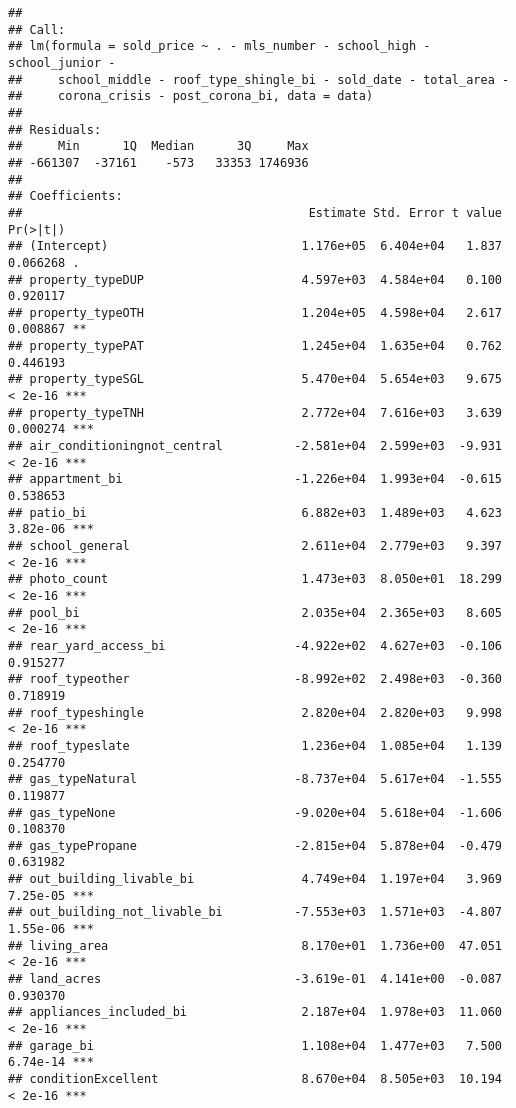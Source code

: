 \documentclass[
]{article}
\begin{document}
\begin{verbatim}
## 
## Call:
## lm(formula = sold_price ~ . - mls_number - school_high - school_junior - 
##     school_middle - roof_type_shingle_bi - sold_date - total_area - 
##     corona_crisis - post_corona_bi, data = data)
## 
## Residuals:
##     Min      1Q  Median      3Q     Max 
## -661307  -37161    -573   33353 1746936 
## 
## Coefficients:
##                                        Estimate Std. Error t value Pr(>|t|)    
## (Intercept)                           1.176e+05  6.404e+04   1.837 0.066268 .  
## property_typeDUP                      4.597e+03  4.584e+04   0.100 0.920117    
## property_typeOTH                      1.204e+05  4.598e+04   2.617 0.008867 ** 
## property_typePAT                      1.245e+04  1.635e+04   0.762 0.446193    
## property_typeSGL                      5.470e+04  5.654e+03   9.675  < 2e-16 ***
## property_typeTNH                      2.772e+04  7.616e+03   3.639 0.000274 ***
## air_conditioningnot_central          -2.581e+04  2.599e+03  -9.931  < 2e-16 ***
## appartment_bi                        -1.226e+04  1.993e+04  -0.615 0.538653    
## patio_bi                              6.882e+03  1.489e+03   4.623 3.82e-06 ***
## school_general                        2.611e+04  2.779e+03   9.397  < 2e-16 ***
## photo_count                           1.473e+03  8.050e+01  18.299  < 2e-16 ***
## pool_bi                               2.035e+04  2.365e+03   8.605  < 2e-16 ***
## rear_yard_access_bi                  -4.922e+02  4.627e+03  -0.106 0.915277    
## roof_typeother                       -8.992e+02  2.498e+03  -0.360 0.718919    
## roof_typeshingle                      2.820e+04  2.820e+03   9.998  < 2e-16 ***
## roof_typeslate                        1.236e+04  1.085e+04   1.139 0.254770    
## gas_typeNatural                      -8.737e+04  5.617e+04  -1.555 0.119877    
## gas_typeNone                         -9.020e+04  5.618e+04  -1.606 0.108370    
## gas_typePropane                      -2.815e+04  5.878e+04  -0.479 0.631982    
## out_building_livable_bi               4.749e+04  1.197e+04   3.969 7.25e-05 ***
## out_building_not_livable_bi          -7.553e+03  1.571e+03  -4.807 1.55e-06 ***
## living_area                           8.170e+01  1.736e+00  47.051  < 2e-16 ***
## land_acres                           -3.619e-01  4.141e+00  -0.087 0.930370    
## appliances_included_bi                2.187e+04  1.978e+03  11.060  < 2e-16 ***
## garage_bi                             1.108e+04  1.477e+03   7.500 6.74e-14 ***
## conditionExcellent                    8.670e+04  8.505e+03  10.194  < 2e-16 ***

\end{verbatim}
\end{document}
